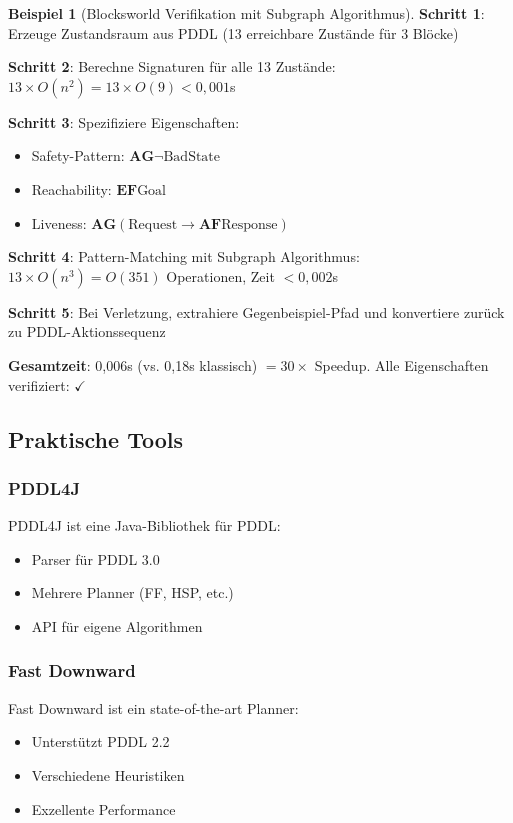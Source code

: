﻿\documentclass[a4paper,12pt]{article}
\theoremstyle{definition}
\newtheorem{beispiel}{Beispiel}[section]
\begin{document}
\begin{beispiel}[Blocksworld Verifikation mit Subgraph Algorithmus]
	\textbf{Schritt 1}: Erzeuge Zustandsraum aus PDDL (13 erreichbare Zustände für 3 Blöcke)

	\textbf{Schritt 2}: Berechne Signaturen für alle 13 Zustände: $13 \times O(n^2) = 13 \times O(9) < 0{,}001$s

	\textbf{Schritt 3}: Spezifiziere Eigenschaften:
	\begin{itemize}
		\item[-] Safety-Pattern: $\mathbf{AG}\neg\text{BadState}$
		\item[-] Reachability: $\mathbf{EF}\text{Goal}$
		\item[-] Liveness: $\mathbf{AG}(\text{Request} \to \mathbf{AF}\text{Response})$
	\end{itemize}

	\textbf{Schritt 4}: Pattern-Matching mit Subgraph Algorithmus: $13 \times O(n^3) = O(351)$ Operationen, Zeit $< 0{,}002$s

	\textbf{Schritt 5}: Bei Verletzung, extrahiere Gegenbeispiel-Pfad und konvertiere zurück zu PDDL-Aktionssequenz

	\textbf{Gesamtzeit}: 0{,}006s (vs. 0{,}18s klassisch) $= 30\times$ Speedup. Alle Eigenschaften verifiziert: $\checkmark$
\end{beispiel}

\subsection{Praktische Tools}

\subsubsection{PDDL4J}

PDDL4J ist eine Java-Bibliothek für PDDL:
\begin{itemize}
	\item[-] Parser für PDDL 3.0
	\item[-] Mehrere Planner (FF, HSP, etc.)
	\item[-] API für eigene Algorithmen
\end{itemize}

\subsubsection{Fast Downward}

Fast Downward ist ein state-of-the-art Planner:
\begin{itemize}
	\item[-] Unterstützt PDDL 2.2
	\item[-] Verschiedene Heuristiken
	\item[-] Exzellente Performance
\end{itemize}
\end{document}
